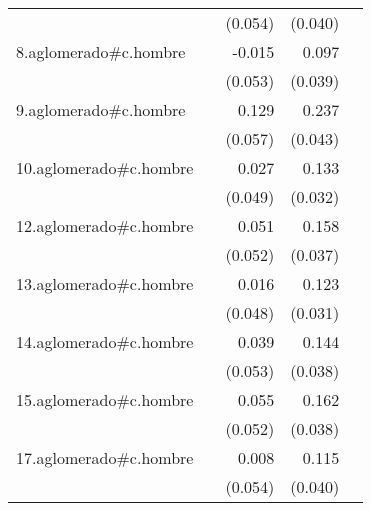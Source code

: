 {\begin{longtable}{l*{4}{D{.}{.}{-1}}}
            &                     &     (0.054)         &     (0.040)         &                     \\
\addlinespace
8.aglomerado#c.hombre&                     &      -0.015         &       0.097\sym{*}  &                     \\
            &                     &     (0.053)         &     (0.039)         &                     \\
\addlinespace
9.aglomerado#c.hombre&                     &       0.129\sym{*}  &       0.237\sym{***}&                     \\
            &                     &     (0.057)         &     (0.043)         &                     \\
\addlinespace
10.aglomerado#c.hombre&                     &       0.027         &       0.133\sym{***}&                     \\
            &                     &     (0.049)         &     (0.032)         &                     \\
\addlinespace
12.aglomerado#c.hombre&                     &       0.051         &       0.158\sym{***}&                     \\
            &                     &     (0.052)         &     (0.037)         &                     \\
\addlinespace
13.aglomerado#c.hombre&                     &       0.016         &       0.123\sym{***}&                     \\
            &                     &     (0.048)         &     (0.031)         &                     \\
\addlinespace
14.aglomerado#c.hombre&                     &       0.039         &       0.144\sym{***}&                     \\
            &                     &     (0.053)         &     (0.038)         &                     \\
\addlinespace
15.aglomerado#c.hombre&                     &       0.055         &       0.162\sym{***}&                     \\
            &                     &     (0.052)         &     (0.038)         &                     \\
\addlinespace
17.aglomerado#c.hombre&                     &       0.008         &       0.115\sym{**} &                     \\
            &                     &     (0.054)         &     (0.040)         &                     \\

\end{longtable}}
